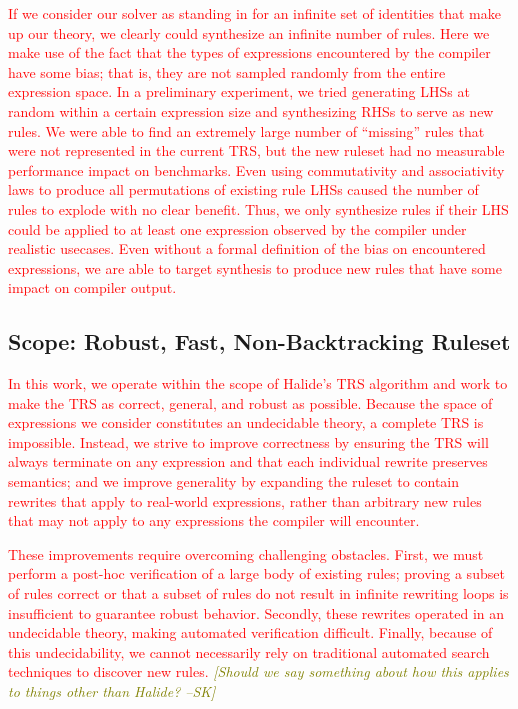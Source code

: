 \documentclass[acmsmall,review]{acmart}\settopmatter{printfolios=true,printccs=false,printacmref=false}
\newcommand{\sak}[1]{\textcolor{olive}{\textit{[{#1} --SK]}}}
\newcommand{\modified}[1]{\textcolor{red}{{#1}}}
\begin{document}
\modified{If we consider our solver as standing in for an infinite set of identities that make up
our theory, we clearly could synthesize an infinite number of rules. Here we make use
of the fact that the types of expressions encountered by the compiler have some bias; 
that is, they are not sampled randomly from the entire expression space. In a preliminary 
experiment, we tried generating LHSs at random within a certain expression size and 
synthesizing RHSs to serve as new rules. We were able to find an extremely large number of 
``missing'' rules that were not represented in the current TRS, but the new ruleset had 
no measurable performance impact on benchmarks. Even using commutativity and associativity 
laws to produce all permutations of existing rule LHSs caused the number of rules to 
explode with no clear benefit. Thus, we only synthesize rules if their LHS could be 
applied to at least one expression observed by the compiler under realistic usecases. Even 
without a formal definition of the bias on encountered expressions, we are able to 
target synthesis to produce new rules that have some impact on compiler output.}

\subsection{Scope: Robust, Fast, Non-Backtracking Ruleset}
\modified{In this work, we operate within the scope of Halide's TRS algorithm
  and work to make the TRS as correct, general, and robust as possible.  Because
  the space of expressions we consider constitutes an undecidable theory, a complete
  TRS is impossible.  Instead, we strive to improve correctness by ensuring the TRS
  will always terminate on any expression and that each individual rewrite
  preserves semantics; and we improve generality by expanding the ruleset to
  contain rewrites that apply to real-world expressions, rather than
  arbitrary new rules that may not apply to any expressions the compiler will encounter.}

\modified{These improvements require overcoming challenging obstacles.  First,
  we must perform a post-hoc verification of a large body of existing rules;
  proving a subset of rules correct or that a subset of rules do not result in infinite
  rewriting loops is insufficient to guarantee robust behavior.  Secondly,
  these rewrites operated in an undecidable theory, making automated verification
  difficult.  Finally, because of this undecidability, we cannot necessarily
  rely on traditional automated search techniques to discover new rules.}
\sak{Should we say something about how this applies to things other than Halide?}
\end{document}
